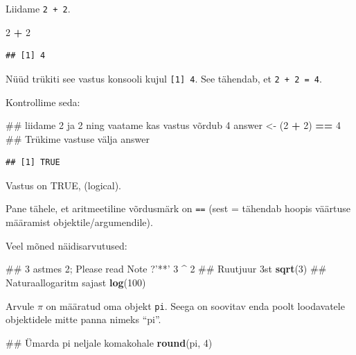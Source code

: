 \documentclass[]{book}
\newenvironment{Shaded}{\begin{snugshade}}{\end{snugshade}}
\newcommand{\KeywordTok}[1]{\textcolor[rgb]{0.13,0.29,0.53}{\textbf{#1}}}
\newcommand{\DecValTok}[1]{\textcolor[rgb]{0.00,0.00,0.81}{#1}}
\newcommand{\StringTok}[1]{\textcolor[rgb]{0.31,0.60,0.02}{#1}}
\newcommand{\OperatorTok}[1]{\textcolor[rgb]{0.81,0.36,0.00}{\textbf{#1}}}
\newcommand{\NormalTok}[1]{#1}
\begin{document}
Liidame \texttt{2\ +\ 2}.

\begin{Shaded}
\begin{Highlighting}[]
\DecValTok{2} \OperatorTok{+}\StringTok{ }\DecValTok{2}
\end{Highlighting}
\end{Shaded}

\begin{verbatim}
## [1] 4
\end{verbatim}

Nüüd trükiti see vastus konsooli kujul \texttt{{[}1{]}\ 4}. See
tähendab, et \texttt{2\ +\ 2\ =\ 4}.

Kontrollime seda:

\begin{Shaded}
\begin{Highlighting}[]
\NormalTok{## liidame 2 ja 2 ning vaatame kas vastus võrdub 4}
\NormalTok{answer <-}\StringTok{ }\NormalTok{(}\DecValTok{2} \OperatorTok{+}\StringTok{ }\DecValTok{2}\NormalTok{) }\OperatorTok{==}\StringTok{ }\DecValTok{4}
\NormalTok{## Trükime vastuse välja}
\NormalTok{answer}
\end{Highlighting}
\end{Shaded}

\begin{verbatim}
## [1] TRUE
\end{verbatim}

Vastus on TRUE, (logical).

Pane tähele, et aritmeetiline võrdusmärk on \texttt{==} (sest = tähendab
hoopis väärtuse määramist objektile/argumendile).

Veel mõned näidisarvutused:

\begin{Shaded}
\begin{Highlighting}[]
\NormalTok{## 3 astmes 2; Please read Note ?'**' }
\DecValTok{3} \OperatorTok{^}\StringTok{ }\DecValTok{2}
\NormalTok{## Ruutjuur 3st}
\KeywordTok{sqrt}\NormalTok{(}\DecValTok{3}\NormalTok{)}
\NormalTok{## Naturaallogaritm sajast}
\KeywordTok{log}\NormalTok{(}\DecValTok{100}\NormalTok{)}
\end{Highlighting}
\end{Shaded}

Arvule \(\pi\) on määratud oma objekt \texttt{pi}. Seega on soovitav
enda poolt loodavatele objektidele mitte panna nimeks ``pi''.

\begin{Shaded}
\begin{Highlighting}[]
\NormalTok{## Ümarda pi neljale komakohale}
\KeywordTok{round}\NormalTok{(pi, }\DecValTok{4}\NormalTok{)}
\end{Highlighting}
\end{Shaded}
\end{document}
